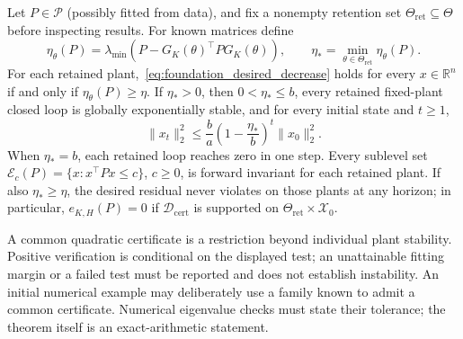 \begin{theorem}
\label{thm:foundation_verification}
Let $P\in\mathcal P$ (possibly fitted from data), and fix a nonempty
retention set $\Theta_{\mathrm{ret}}\subseteq\Theta$ before inspecting results.
For known matrices define
\begin{equation}
\label{eq:foundation_verified_margin}
 \eta_\theta(P)=\lambda_{\min}
  \!\left(P-G_K(\theta)^\top P G_K(\theta)\right),
 \qquad \eta_* =\min_{\theta\in\Theta_{\mathrm{ret}}}\eta_\theta(P).
\end{equation}
For each retained plant,~\eqref{eq:foundation_desired_decrease} holds for
every $x\in\mathbb R^n$ if and only if $\eta_\theta(P)\ge\eta$.
If $\eta_*>0$, then $0<\eta_*\le b$, every retained fixed-plant closed loop
is globally exponentially stable, and for every initial state and $t\ge1$,
\begin{equation}
\label{eq:foundation_exponential_bound}
 \|x_t\|_2^2\le\frac ba
       \left(1-\frac{\eta_*}{b}\right)^t\|x_0\|_2^2.
\end{equation}
When $\eta_*=b$, each retained loop reaches zero in one step.
Every sublevel set $\mathcal E_c(P)=\{x:x^\top Px\le c\}$, $c\ge0$,
is forward invariant for each retained plant. If also $\eta_*\ge\eta$,
the desired residual never violates on those plants at any horizon; in
particular, $e_{K,H}(P)=0$ if $\mathcal D_{\mathrm{cert}}$ is supported on
$\Theta_{\mathrm{ret}}\times\mathcal X_0$.
\end{theorem}

A common quadratic certificate is a restriction beyond individual plant
stability. Positive verification is conditional on the displayed test;
an unattainable fitting margin or a failed test must be reported and does
not establish instability. An initial numerical example may deliberately use
a family known to admit a common certificate. Numerical eigenvalue checks must state
their tolerance; the theorem itself is an exact-arithmetic statement.

